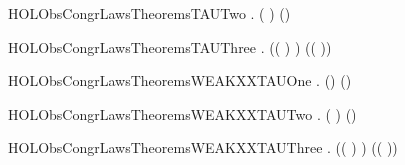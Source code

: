\newcommand{\HOLObsCongrLawsTheoremsTAUOne}{\UseVerbatim{HOLObsCongrLawsTheoremsTAUOne}}
\begin{SaveVerbatim}{HOLObsCongrLawsTheoremsTAUTwo}
\HOLTokenTurnstile{} \HOLSymConst{\HOLTokenForall{}}.  ( \HOLSymConst{\ensuremath{+}} \HOLConst{\ensuremath{\tau}}) (\HOLConst{\ensuremath{\tau}})
\end{SaveVerbatim}
\newcommand{\HOLObsCongrLawsTheoremsTAUTwo}{\UseVerbatim{HOLObsCongrLawsTheoremsTAUTwo}}
\begin{SaveVerbatim}{HOLObsCongrLawsTheoremsTAUThree}
\HOLTokenTurnstile{} \HOLSymConst{\HOLTokenForall{}}  .  (( \HOLSymConst{\ensuremath{+}} \HOLConst{\ensuremath{\tau}}) \HOLSymConst{\ensuremath{+}} ) (( \HOLSymConst{\ensuremath{+}} \HOLConst{\ensuremath{\tau}}))
\end{SaveVerbatim}
\newcommand{\HOLObsCongrLawsTheoremsTAUThree}{\UseVerbatim{HOLObsCongrLawsTheoremsTAUThree}}
\begin{SaveVerbatim}{HOLObsCongrLawsTheoremsWEAKXXTAUOne}
\HOLTokenTurnstile{} \HOLSymConst{\HOLTokenForall{}} .  (\HOLConst{\ensuremath{\tau}}) ()
\end{SaveVerbatim}
\newcommand{\HOLObsCongrLawsTheoremsWEAKXXTAUOne}{\UseVerbatim{HOLObsCongrLawsTheoremsWEAKXXTAUOne}}
\begin{SaveVerbatim}{HOLObsCongrLawsTheoremsWEAKXXTAUTwo}
\HOLTokenTurnstile{} \HOLSymConst{\HOLTokenForall{}}.  ( \HOLSymConst{\ensuremath{+}} \HOLConst{\ensuremath{\tau}}) (\HOLConst{\ensuremath{\tau}})
\end{SaveVerbatim}
\newcommand{\HOLObsCongrLawsTheoremsWEAKXXTAUTwo}{\UseVerbatim{HOLObsCongrLawsTheoremsWEAKXXTAUTwo}}
\begin{SaveVerbatim}{HOLObsCongrLawsTheoremsWEAKXXTAUThree}
\HOLTokenTurnstile{} \HOLSymConst{\HOLTokenForall{}}  .  (( \HOLSymConst{\ensuremath{+}} \HOLConst{\ensuremath{\tau}}) \HOLSymConst{\ensuremath{+}} ) (( \HOLSymConst{\ensuremath{+}} \HOLConst{\ensuremath{\tau}}))
\end{SaveVerbatim}
